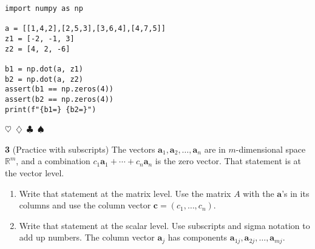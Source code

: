 \documentclass{article}
\newcommand{\sep}{\begin{center}$\heartsuit$~$\diamondsuit$~$\clubsuit$~$\spadesuit$\end{center}}
\newcommand{\vect}[1]{\ensuremath{\boldsymbol{#1}}}
\begin{document}
\begin{verbatim}
import numpy as np

a = [[1,4,2],[2,5,3],[3,6,4],[4,7,5]]
z1 = [-2, -1, 3]
z2 = [4, 2, -6]

b1 = np.dot(a, z1)
b2 = np.dot(a, z2)
assert(b1 == np.zeros(4))
assert(b2 == np.zeros(4))
print(f"{b1=} {b2=}")
\end{verbatim}

\sep
\noindent\textbf{3} (Practice with subscripts) The vectors $\vect{a}_1, \vect{a}_2, \ldots , \vect{a}_n$ are in $m$-dimensional space $\mathbb{R}^m$, and a combination $c_1\vect{a}_1 + \cdots + c_n\vect{a}_n$ is the zero vector. That statement is at the vector level. 
\begin{enumerate}
\item Write that statement at the matrix level. Use the matrix $A$ with the $\vect{a}$'s in its columns and use the column vector $\vect{c} = (c_1, \ldots, c_n)$.
\item Write that statement at the scalar level. Use subscripts and sigma notation to add up numbers. The column vector $\vect{a}_j$ has components $\vect{a}_{1j}, \vect{a}_{2j}, \ldots, \vect{a}_{mj}$.
\end{enumerate}
\end{document}
